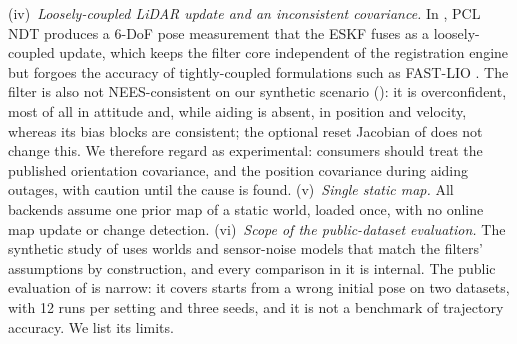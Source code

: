 (iv)~\emph{Loosely-coupled LiDAR update and an inconsistent covariance.} In , PCL NDT produces a 6-DoF pose measurement that the ESKF fuses as a loosely-coupled update, which keeps the filter core independent of the registration engine but forgoes the accuracy of tightly-coupled formulations such as FAST-LIO \citep{xu2021fastlio}. The filter is also not NEES-consistent on our synthetic scenario (): it is overconfident, most of all in attitude and, while aiding is absent, in position and velocity, whereas its bias blocks are consistent; the optional reset Jacobian of \citet{sola2017quaternion} does not change this. We therefore regard  as experimental: consumers should treat the published orientation covariance, and the position covariance during aiding outages, with caution until the cause is found.
(v)~\emph{Single static map.} All backends assume one prior map of a static world, loaded once, with no online map update or change detection.
(vi)~\emph{Scope of the public-dataset evaluation.} The synthetic study of  uses worlds and sensor-noise models that match the filters' assumptions by construction, and every comparison in it is internal. The public evaluation of  is narrow: it covers starts from a wrong initial pose on two datasets, with 12 runs per setting and three seeds, and it is not a benchmark of trajectory accuracy. We list its limits.
